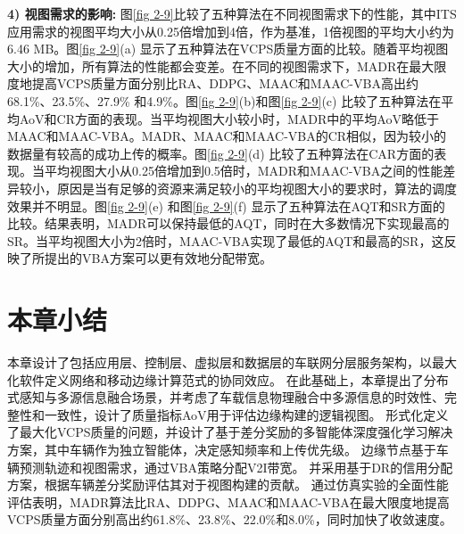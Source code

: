\textbf{4) 视图需求的影响:}
图\ref{fig 2-9}比较了五种算法在不同视图需求下的性能，其中ITS应用需求的视图平均大小从0.25倍增加到4倍，作为基准，1倍视图的平均大小约为6.46 MB。图\ref{fig 2-9}(a) 显示了五种算法在VCPS质量方面的比较。随着平均视图大小的增加，所有算法的性能都会变差。在不同的视图需求下，MADR在最大限度地提高VCPS质量方面分别比RA、DDPG、MAAC和MAAC-VBA高出约68.1\%、23.5\%、27.9\% 和4.9\%。图\ref{fig 2-9}(b)和图\ref{fig 2-9}(c) 比较了五种算法在平均AoV和CR方面的表现。当平均视图大小较小时，MADR中的平均AoV略低于MAAC和MAAC-VBA。MADR、MAAC和MAAC-VBA的CR相似，因为较小的数据量有较高的成功上传的概率。图\ref{fig 2-9}(d) 比较了五种算法在CAR方面的表现。当平均视图大小从0.25倍增加到0.5倍时，MADR和MAAC-VBA之间的性能差异较小，原因是当有足够的资源来满足较小的平均视图大小的要求时，算法的调度效果并不明显。图\ref{fig 2-9}(e) 和图\ref{fig 2-9}(f) 显示了五种算法在AQT和SR方面的比较。结果表明，MADR可以保持最低的AQT，同时在大多数情况下实现最高的SR。当平均视图大小为2倍时，MAAC-VBA实现了最低的AQT和最高的SR，这反映了所提出的VBA方案可以更有效地分配带宽。

\section[\hspace{-2pt}本章小结]{{ \hspace{-8pt}本章小结}}\label{section 2-7}

本章设计了包括应用层、控制层、虚拟层和数据层的车联网分层服务架构，以最大化软件定义网络和移动边缘计算范式的协同效应。
在此基础上，本章提出了分布式感知与多源信息融合场景，并考虑了车载信息物理融合中多源信息的时效性、完整性和一致性，设计了质量指标AoV用于评估边缘构建的逻辑视图。
形式化定义了最大化VCPS质量的问题，并设计了基于差分奖励的多智能体深度强化学习解决方案，其中车辆作为独立智能体，决定感知频率和上传优先级。
边缘节点基于车辆预测轨迹和视图需求，通过VBA策略分配V2I带宽。
并采用基于DR的信用分配方案，根据车辆差分奖励评估其对于视图构建的贡献。
通过仿真实验的全面性能评估表明，MADR算法比RA、DDPG、MAAC和MAAC-VBA在最大限度地提高VCPS质量方面分别高出约61.8\%、23.8\%、22.0\%和8.0\%，同时加快了收敛速度。
